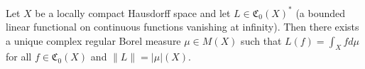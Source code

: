 Let $X$ be a locally compact Hausdorff space and let $L \in \mathfrak{C}_0(X)^*$ (a bounded linear functional on continuous functions vanishing at infinity). Then there exists a unique complex regular Borel measure $\mu \in M(X)$ such that $L(f) = \int_X f d\mu$ for all $f \in \mathfrak{C}_0(X)$ and $\|L\| = |\mu|(X)$.
